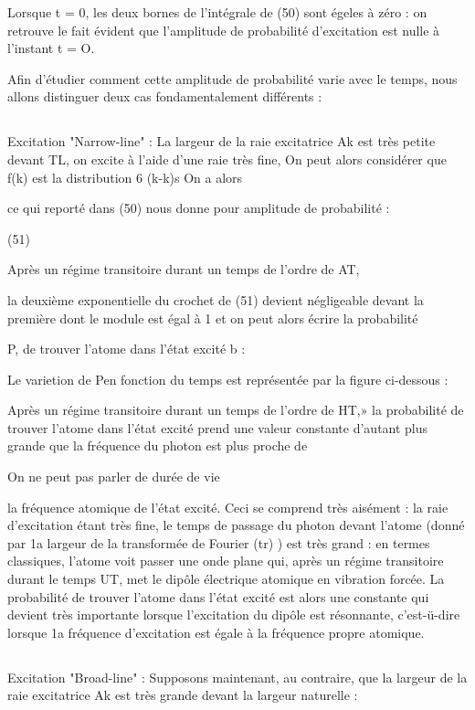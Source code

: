 
Lorsque t = 0, les deux bornes de l'intégrale de (50) sont
égeles à zéro : on retrouve le fait évident que l'amplitude de probabilité
d'excitation est nulle à l'instant t = O.

Afin d'étudier comment cette amplitude de probabilité varie
avec le temps, nous allons distinguer deux cas fondamentalement différents :
\subsection{} Excitation "Narrow-line" :%
La largeur de la raie excitatrice Ak est très
petite devant TL,  on excite à l'aide d'une raie très fine, On peut alors
considérer que f(k) est la distribution 6 (k-k)s On a alors

ce qui reporté dans (50) nous donne pour amplitude de probabilité :

(51)

Après un régime transitoire durant un temps de l'ordre de AT,

la deuxième exponentielle du crochet de (51) devient négligeable devant la
première dont le module est égal à 1 et on peut alors écrire la probabilité

P, de trouver l'atome dans l'état excité b :

Le varietion de Pen fonction du temps est représentée par la figure ci-dessous :

Après un régime transitoire durant un temps de l'ordre de
HT,» la probabilité de trouver l'atome dans l'état excité prend une valeur
constante d'autant plus grande que la fréquence du photon est plus proche de

 On ne peut pas parler de durée de vie



la fréquence atomique
de l'état excité.
Ceci se comprend très aisément : la raie d'excitation étant
très fine, le temps de passage du photon devant l'atome (donné par 1a largeur
de la transformée de Fourier  (tr) ) est très grand : en termes classiques,
l'atome voit passer une onde plane qui, après un régime transitoire durant le
temps UT, met le dipôle électrique atomique en vibration forcée. La probabilité de trouver l'atome dans l'état excité est alors une constante qui devient
très importante lorsque l'excitation du dipôle est résonnante, c'est-ü-dire
lorsque 1a fréquence d'excitation est égale à la fréquence propre atomique.
\subsection{} Excitation "Broad-line" :%
Supposons maintenant, au contraire, que la largeur de la raie
excitatrice Ak est très grande devant la largeur naturelle :

